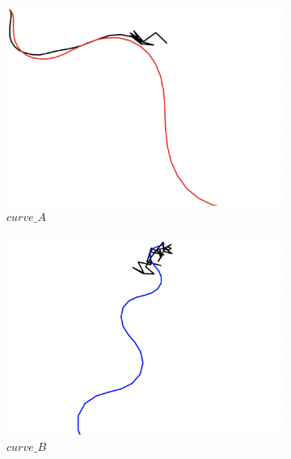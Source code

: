 \begin{figure}[H]
     \centering
     \begin{subfigure}[b]{0.31\textwidth}
         \centering
         \includegraphics[width=\textwidth]{images/ddpg_results/simple_envs_S1_S2/S2_A1_R3_5mio_curve_A.png}
         \caption{$curve\_A$}
     \end{subfigure}
     \hfill
     \begin{subfigure}[b]{0.31\textwidth}
         \centering
         \includegraphics[width=\textwidth]{images/ddpg_results/simple_envs_S1_S2/S2_A1_R3_5mio_curve_B.png}
         \caption{$curve\_B$}
     \end{subfigure}
     \hfill
     \begin{subfigure}[b]{0.31\textwidth}
         \centering

\end{subfigure}
\end{figure}
